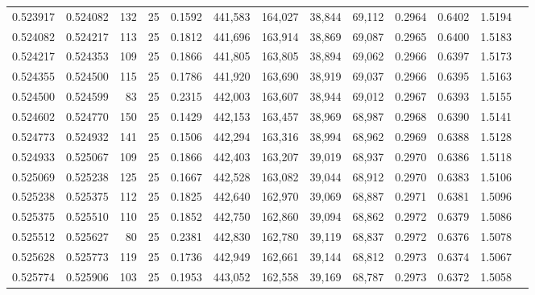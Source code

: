 \begin{tabular}{rrrrrrrrrrrrr}
0.523917 & 0.524082 &   132 &  25 &                                     0.1592 & 441,583 & 164,027 &  38,844 &  69,112 & 0.2964 & 0.6402 & 1.5194 \\
0.524082 & 0.524217 &   113 &  25 &                                     0.1812 & 441,696 & 163,914 &  38,869 &  69,087 & 0.2965 & 0.6400 & 1.5183 \\
0.524217 & 0.524353 &   109 &  25 &                                     0.1866 & 441,805 & 163,805 &  38,894 &  69,062 & 0.2966 & 0.6397 & 1.5173 \\
0.524355 & 0.524500 &   115 &  25 &                                     0.1786 & 441,920 & 163,690 &  38,919 &  69,037 & 0.2966 & 0.6395 & 1.5163 \\
0.524500 & 0.524599 &    83 &  25 &                                     0.2315 & 442,003 & 163,607 &  38,944 &  69,012 & 0.2967 & 0.6393 & 1.5155 \\
0.524602 & 0.524770 &   150 &  25 &                                     0.1429 & 442,153 & 163,457 &  38,969 &  68,987 & 0.2968 & 0.6390 & 1.5141 \\
0.524773 & 0.524932 &   141 &  25 &                                     0.1506 & 442,294 & 163,316 &  38,994 &  68,962 & 0.2969 & 0.6388 & 1.5128 \\
0.524933 & 0.525067 &   109 &  25 &                                     0.1866 & 442,403 & 163,207 &  39,019 &  68,937 & 0.2970 & 0.6386 & 1.5118 \\
0.525069 & 0.525238 &   125 &  25 &                                     0.1667 & 442,528 & 163,082 &  39,044 &  68,912 & 0.2970 & 0.6383 & 1.5106 \\
0.525238 & 0.525375 &   112 &  25 &                                     0.1825 & 442,640 & 162,970 &  39,069 &  68,887 & 0.2971 & 0.6381 & 1.5096 \\
0.525375 & 0.525510 &   110 &  25 &                                     0.1852 & 442,750 & 162,860 &  39,094 &  68,862 & 0.2972 & 0.6379 & 1.5086 \\
0.525512 & 0.525627 &    80 &  25 &                                     0.2381 & 442,830 & 162,780 &  39,119 &  68,837 & 0.2972 & 0.6376 & 1.5078 \\
0.525628 & 0.525773 &   119 &  25 &                                     0.1736 & 442,949 & 162,661 &  39,144 &  68,812 & 0.2973 & 0.6374 & 1.5067 \\
0.525774 & 0.525906 &   103 &  25 &                                     0.1953 & 443,052 & 162,558 &  39,169 &  68,787 & 0.2973 & 0.6372 & 1.5058 \\

\end{tabular}
